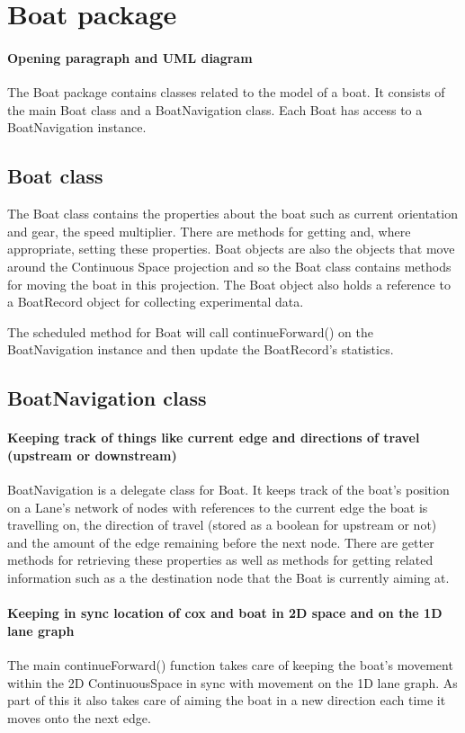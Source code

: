 \section{Boat package}
\paragraph{Opening paragraph and UML diagram}
The Boat package contains classes related to the model of a boat. It
consists of the main Boat class and a BoatNavigation class. Each Boat
has access to a BoatNavigation instance.

\subsection{Boat class}
The Boat class contains the properties about the boat such as current
orientation and gear, the speed multiplier. There are methods for
getting and, where appropriate, setting these properties. Boat objects are also the
objects that move around the Continuous Space projection and so the
Boat class contains methods for moving the boat in this
projection. The Boat object also holds a reference to a BoatRecord
object for collecting experimental data.

The scheduled method for Boat will call continueForward() on the
BoatNavigation instance and then update the BoatRecord's statistics.
\subsection{BoatNavigation class}
\paragraph{Keeping track of things like current edge and
directions of travel (upstream or downstream)}
BoatNavigation is a delegate class for Boat. It keeps track of the
boat's position on a Lane's network of nodes with references to the
current edge the boat is travelling on, the direction of travel
(stored as a boolean for upstream or not) and the amount of the edge
remaining before the next node. There are getter methods for
retrieving these properties as well as methods for getting related
information such as a the destination node that the Boat is currently
aiming at.

\paragraph{Keeping in sync location of cox and boat in 2D space and on the 1D lane graph}
The main continueForward() function takes care of keeping the
boat's movement within the 2D ContinuousSpace in sync with
movement on the 1D lane graph. As part of this it also takes care of
aiming the boat in a new direction each time it moves onto the next
edge.

